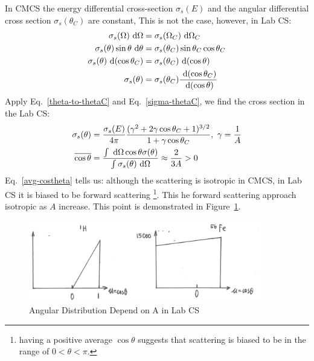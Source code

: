 \documentclass{school-22.101-notes}
\date{November 30, 2011}
\begin{document}
\maketitle

In CMCS the energy differential cross-section $\sigma_s(E)$ and the angular differential cross section $\sigma_s(\theta_C)$ are constant,
This is not the case, however, in Lab CS:
\begin{align}
\sigma_s (\Omega) \mbox{ }\mathrm{d} \Omega &= \sigma_s (\Omega_C) \mbox{ }\mathrm{d} \Omega_C \\
\sigma_s (\theta) \sin \theta \mbox{ }\mathrm{d} \theta &= \sigma_s (\theta_C) \sin \theta_C \cos \theta_C \\
\sigma_s (\theta) \mbox{ }\mathrm{d}(\cos \theta_C) &= \sigma_s (\theta_C) \mbox{ }\mathrm{d}(\cos \theta) \\
\sigma_s (\theta) &= \sigma_s (\theta_C) \frac{\mbox{ }\mathrm{d}(\cos \theta_C)}{\mbox{ }\mathrm{d}(\cos \theta)}
\end{align}
Apply Eq.~\ref{theta-to-thetaC} and Eq.~\ref{sigma-thetaC}, we find the cross section in the Lab CS:
\begin{align}
\sigma_s (\theta) &= \frac{\sigma_s (E)}{4 \pi} \frac{(\gamma^2 + 2 \gamma \cos \theta_C + 1)^{3/2}}{1 + \gamma \cos \theta_C}, \mbox{ } \gamma = \frac{1}{A}  \\
\overline{\cos \theta} &= \frac{\int \mbox{ }\mathrm{d} \Omega \cos \theta \sigma(\theta)}{\int \sigma_s (\theta) \mbox{ }\mathrm{d} \Omega} \approx \frac{2}{3A} > 0 \label{avg-costheta}
\end{align}
Eq.~\ref{avg-costheta} tells us: although the scattering is isotropic in CMCS, in Lab CS it is biased to be forward scattering \footnote{having a positive average $\cos \theta$ suggests that scattering is biased to be in the range of $0 < \theta < \pi$.}. This he forward scattering approach isotropic as $A$ increase. This point is demonstrated in Figure~\ref{P-vs-u}.
\begin{figure}
    \centering
    \includegraphics[width=4in]{images/ni/P-vs-u.png}
    \caption{Angular Distribution Depend on A in Lab CS\label{P-vs-u}}
\end{figure}
\end{document}
